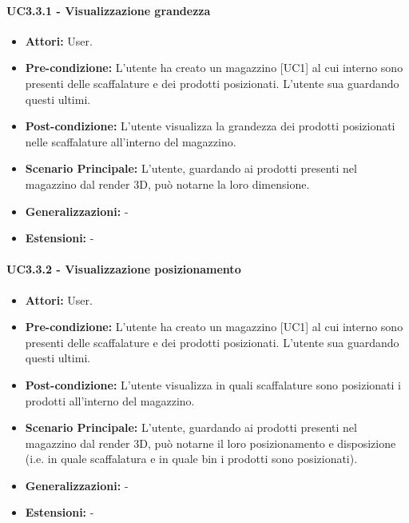 \paragraph{UC3.3.1 - Visualizzazione grandezza}
\begin{itemize}
    \item \textbf{Attori:} User.
    \item \textbf{Pre-condizione:} L'utente ha creato un magazzino [UC1] al cui interno sono presenti delle scaffalature e dei prodotti posizionati. L'utente sua guardando questi ultimi.
    \item \textbf{Post-condizione:} L'utente visualizza la grandezza dei prodotti posizionati nelle scaffalature all'interno del magazzino.
    \item \textbf{Scenario Principale:} L'utente, guardando ai prodotti presenti nel magazzino dal render 3D, può notarne la loro dimensione.
    \item \textbf{Generalizzazioni:} -
    \item \textbf{Estensioni:} -
\end{itemize}


\paragraph{UC3.3.2 - Visualizzazione posizionamento}
\begin{itemize}
    \item \textbf{Attori:} User.
    \item \textbf{Pre-condizione:} L'utente ha creato un magazzino [UC1] al cui interno sono presenti delle scaffalature e dei prodotti posizionati. L'utente sua guardando questi ultimi.
    \item \textbf{Post-condizione:} L'utente visualizza in quali scaffalature sono posizionati i prodotti all'interno del magazzino.
    \item \textbf{Scenario Principale:}  L'utente, guardando ai prodotti presenti nel magazzino dal render 3D, può notarne il loro posizionamento e disposizione (i.e. in quale scaffalatura e in quale bin i prodotti sono posizionati).
    \item \textbf{Generalizzazioni:} -
    \item \textbf{Estensioni:} -
\end{itemize}